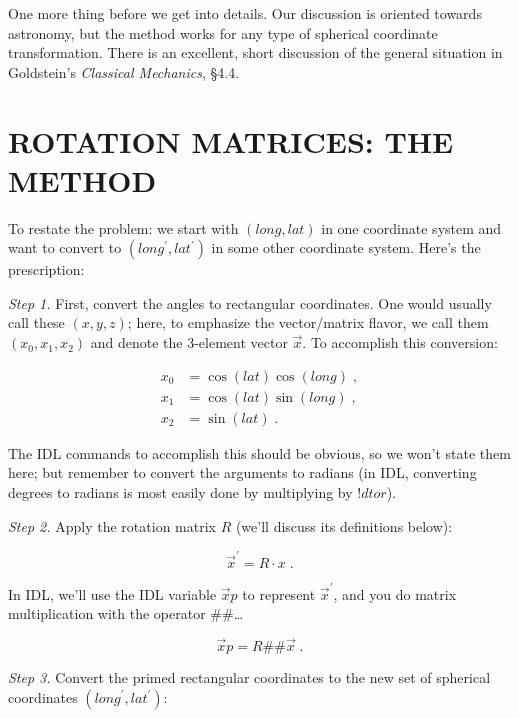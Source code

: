 \documentclass[]{article}
\begin{document}
    One more thing before we get into details. Our discussion is
oriented towards astronomy, but the method works for any type of
spherical coordinate transformation. There is an excellent, short
discussion of the general situation in Goldstein's {\it Classical
Mechanics}, \S 4.4.

\section {ROTATION MATRICES: THE METHOD}

    To restate the problem: we start with $(long, lat)$ in one
coordinate system and want to convert to $(long^\prime, lat^\prime)$ in some other
coordinate system. Here's the prescription:

    {\it Step 1.} First, convert the angles to rectangular
coordinates.  One would usually call these $(x, y, z)$; here, to
emphasize the vector/matrix flavor, we call them $(x_0, x_1, x_2)$ and
denote the 3-element vector ${\vec x}$.  To accomplish this conversion:

\begin{align}
x_0 &= \cos(lat) \cos(long) \; , \\
x_1 &= \cos(lat) \sin(long) \; , \\
x_2 &= \sin(lat) \; .
\end{align}

\noindent The IDL commands to accomplish this should be obvious, so we
won't state them here; but remember to convert the arguments to radians
(in IDL, converting degrees to radians is most easily done by
multiplying by $!dtor$). 

    {\it Step 2.} Apply the rotation matrix ${R}$ (we'll discuss its
definitions below): 

\begin{equation}
{\vec x^\prime} = {R \cdot x} \; .
\end{equation}

\noindent In IDL, we'll use the IDL variable ${\vec xp}$ to represent ${\vec
x^\prime}$, and you do matrix multiplication with the operator $\#\#$\dots

\begin{equation}
{\vec xp} = {R} \#\# {\vec x} \; .
\end{equation}

    {\it Step 3.} Convert the primed rectangular coordinates to the
new set of spherical coordinates $(long^\prime, lat^\prime)$:
\end{document}

